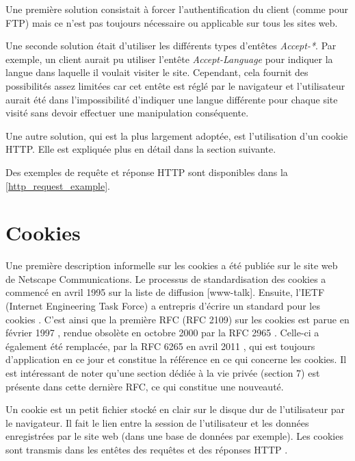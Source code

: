Une première solution consistait à forcer l'authentification du client (comme pour FTP) mais ce n'est pas toujours nécessaire ou applicable sur tous les sites web.

Une seconde solution était d'utiliser les différents types d'entêtes \emph{Accept-*}. Par exemple, un client aurait pu utiliser l'entête \emph{Accept-Language} pour indiquer la langue dans laquelle il voulait visiter le site. Cependant, cela fournit des possibilités assez limitées car cet entête est réglé par le navigateur et l'utilisateur aurait été dans l'impossibilité d'indiquer une langue différente pour chaque site visité sans devoir effectuer une manipulation conséquente.

Une autre solution, qui est la plus largement adoptée, est l'utilisation d'un cookie HTTP. Elle est expliquée plus en détail dans la section suivante.

Des exemples de requête et réponse HTTP sont disponibles dans la \autoref{http_request_example}.


\section{Cookies}
Une première description informelle sur les cookies a été publiée sur le site web de Netscape Communications. Le processus de standardisation des cookies a commencé en avril 1995 sur la liste de diffusion [www-talk]. Ensuite, l'IETF (Internet Engineering Task Force) a entrepris d'écrire un standard pour les cookies \cite{Kristol:2001:HCS:502152.502153}. C'est ainsi que la première RFC (RFC 2109) sur les cookies est parue en février 1997 \cite{IETF_RFC2109}, rendue obsolète en octobre 2000 par la RFC 2965 \cite{IETF_RFC2965}. Celle-ci a également été remplacée, par la RFC 6265 en avril 2011 \cite{IETF_RFC6265}, qui est toujours d'application en ce jour et constitue la référence en ce qui concerne les cookies. Il est intéressant de noter qu'une section dédiée à la vie privée (section 7) est présente dans cette dernière RFC, ce qui constitue une nouveauté.
\newline

Un cookie est un petit fichier stocké en clair sur le disque dur de l'utilisateur par le navigateur. Il fait le lien entre la session de l'utilisateur et les données enregistrées par le site web (dans une base de données par exemple). Les cookies sont transmis dans les entêtes des requêtes et des réponses HTTP \cite{IETF_RFC6265}.


